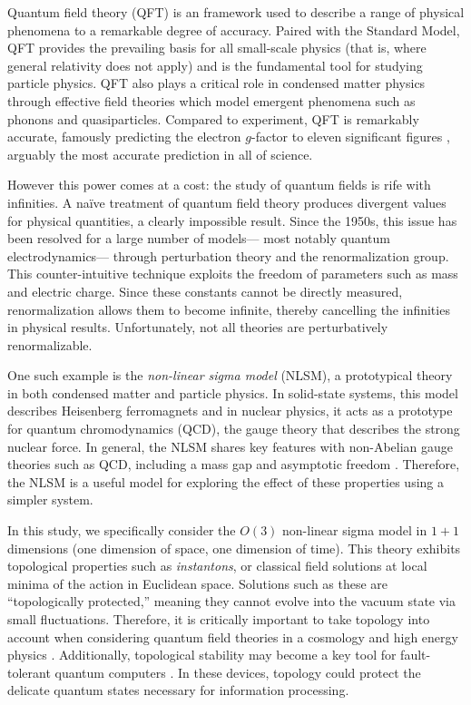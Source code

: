 Quantum field theory (QFT) is an framework used to describe a range of physical phenomena to a remarkable degree of accuracy. Paired with the Standard Model, QFT provides the prevailing basis for all small-scale physics (that is, where general relativity does not apply) and is the fundamental tool for studying particle physics. QFT also plays a critical role in condensed matter physics through effective field theories which model emergent phenomena such as phonons and quasiparticles. Compared to experiment, QFT is remarkably accurate, famously predicting the electron $g$-factor to eleven significant figures \cite{odom2006}, arguably the most accurate prediction in all of science.

However this power comes at a cost: the study of quantum fields is rife with infinities. A na\"ive treatment of quantum field theory produces divergent values for physical quantities, a clearly impossible result. Since the 1950s, this issue has been resolved for a large number of models--- most notably quantum electrodynamics--- through perturbation theory and the renormalization group. This counter-intuitive technique exploits the freedom of parameters such as mass and electric charge. Since these constants cannot be directly measured, renormalization allows them to become infinite, thereby cancelling the infinities in physical results. Unfortunately, not all theories are perturbatively renormalizable. 

One such example is the \textit{non-linear sigma model} (NLSM), a prototypical theory in both condensed matter and particle physics. In solid-state systems, this model describes Heisenberg ferromagnets \cite{callan1985} and in nuclear physics, it acts as a prototype for quantum chromodynamics (QCD), the gauge theory that describes the strong nuclear force. In general, the NLSM shares key features with non-Abelian gauge theories such as QCD, including a mass gap and asymptotic freedom \cite{polyakov1975}. Therefore, the NLSM is a useful model for exploring the effect of these properties using a simpler system.

In this study, we specifically consider the $O(3)$ non-linear sigma model in $1+1$ dimensions (one dimension of space, one dimension of time). This theory exhibits topological properties such as \textit{instantons}, or classical field solutions at local minima of the action in Euclidean space. Solutions such as these are ``topologically protected,'' meaning they cannot evolve into the vacuum state via small fluctuations. Therefore, it is critically important to take topology into account when considering quantum field theories in a cosmology and high energy physics \cite{goddard1986}. Additionally, topological stability may become a key tool for fault-tolerant quantum computers \cite{kitaev1997}. In these devices, topology could protect the delicate quantum states necessary for information processing.

